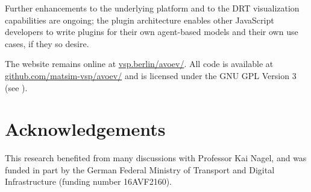 Further enhancements to the underlying platform and to the DRT visualization capabilities are ongoing; the plugin architecture enables other JavaScript developers to write plugins for their own agent-based models and their own use cases, if they so desire.

The website remains online at \href{https://vsp.berlin/avoev/}{vsp.berlin/avoev/}. All code is available at \href{https://github.com/matsim-vsp/avoev}{github.com/matsim-vsp/avoev/} and is licensed under the GNU GPL Version 3 (see \cite{FSF2007GnuGPL}).

\section{Acknowledgements}

This research benefited from many discussions with Professor Kai Nagel, and was funded in part by the German Federal Ministry of Transport and Digital Infrastructure (funding number 16AVF2160).
